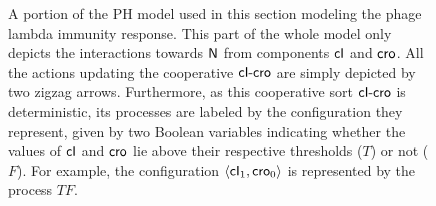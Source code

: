 \begin{figure}
{
}
\caption{\label{fig:phage-lambda-cIcro-N}%
  A portion of the PH model used in this section modeling the phage lambda immunity response.
  This part of the whole model only depicts the interactions towards $\mathsf{N}$ from components
  $\mathsf{cI}$ and $\mathsf{cro}$.
  All the actions updating the cooperative $\mathsf{cI\mbox{-}cro}$ are simply depicted by two
  zigzag arrows.
  Furthermore, as this cooperative sort $\mathsf{cI\mbox{-}cro}$ is deterministic,
  its processes are labeled by the configuration they represent,
  given by two Boolean variables indicating whether
  the values of $\mathsf{cI}$ and $\mathsf{cro}$ lie above their respective thresholds ($T$) or not ($F$).
  For example, the configuration $\langle \mathsf{cI}_1, \mathsf{cro}_0 \rangle$ is represented by the process $TF$.
}
\end{figure}

